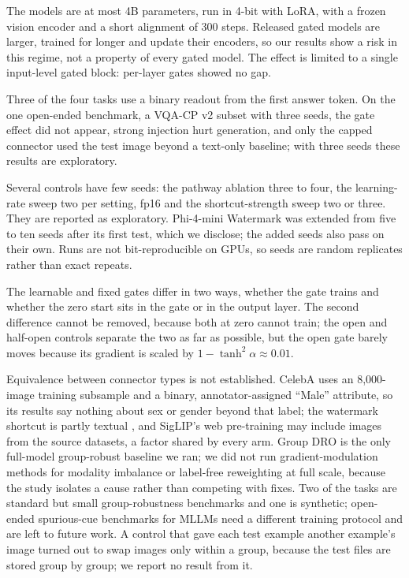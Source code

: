 The models are at most 4B parameters, run in 4-bit with LoRA, with a frozen vision encoder and a short alignment of
300 steps. Released gated models are larger, trained for longer and update their encoders, so our results show a
risk in this regime, not a property of every gated model. The effect is limited to a single input-level gated block:
per-layer gates showed no gap.

Three of the four tasks use a binary readout from the first answer token. On the one open-ended benchmark, a VQA-CP v2
subset with three seeds, the gate effect did not appear, strong injection hurt generation, and only the capped
connector used the test image beyond a text-only baseline; with three seeds these results are exploratory.

Several controls have few seeds: the pathway ablation three to four, the learning-rate sweep two per setting, fp16 and the
shortcut-strength sweep two or three. They are reported as exploratory. Phi-4-mini Watermark was extended from five to
ten seeds after its first test, which we disclose; the added seeds also pass on their own. Runs are not
bit-reproducible on GPUs, so seeds are random replicates rather than exact repeats.

The learnable and fixed gates differ in two ways, whether the gate trains and whether the zero start sits in the gate
or in the output layer. The second difference cannot be removed, because both at zero cannot train; the open and
half-open controls separate the two as far as possible, but the open gate barely moves because its gradient is scaled
by \(1 - \tanh^2\alpha \approx 0.01\).

Equivalence between connector types is not established. CelebA uses an 8,000-image training subsample and a binary,
annotator-assigned ``Male'' attribute, so its results say nothing about sex or gender beyond that label; the watermark
shortcut is partly textual \citep{materzynska2022disentangling}, and SigLIP's web pre-training may include images from the
source datasets, a factor shared by every arm. Group DRO is the only full-model group-robust baseline we ran; we did
not run gradient-modulation methods for modality imbalance \citep{peng2022balanced} or label-free reweighting at full
scale, because the study isolates a cause rather than competing with fixes. Two of the tasks are standard but small
group-robustness benchmarks and one is synthetic; open-ended spurious-cue benchmarks for MLLMs
\citep{ye2026mmspubench,yang2025spuriverse} need a different training protocol and are left to future work. A control
that gave each test example another example's image turned out to swap images only within a group, because the test
files are stored group by group; we report no result from it.
